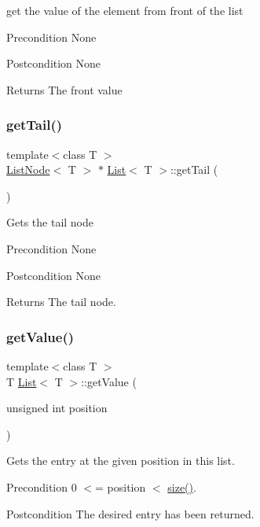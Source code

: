 get the value of the element from front of the list \begin{DoxyPrecond}{Precondition}
None 
\end{DoxyPrecond}
\begin{DoxyPostcond}{Postcondition}
None 
\end{DoxyPostcond}
\begin{DoxyReturn}{Returns}
The front value 
\end{DoxyReturn}
\mbox{\label{class_list_a9d222b730d906bcf6fb0834c9c729788}} 
\subsubsection{\texorpdfstring{get\+Tail()}{getTail()}}
{\footnotesize\ttfamily template$<$class T $>$ \\
\hyperlink{class_list_node}{List\+Node}$<$ T $>$ $\ast$ \hyperlink{class_list}{List}$<$ T $>$\+::get\+Tail (\begin{DoxyParamCaption}{ }\end{DoxyParamCaption})}

Gets the tail node \begin{DoxyPrecond}{Precondition}
None 
\end{DoxyPrecond}
\begin{DoxyPostcond}{Postcondition}
None 
\end{DoxyPostcond}
\begin{DoxyReturn}{Returns}
The tail node. 
\end{DoxyReturn}
\mbox{\label{class_list_a54d9d5eb688177d16ae8f33a317282a5}} 
\subsubsection{\texorpdfstring{get\+Value()}{getValue()}}
{\footnotesize\ttfamily template$<$class T $>$ \\
T \hyperlink{class_list}{List}$<$ T $>$\+::get\+Value (\begin{DoxyParamCaption}\item[{unsigned int}]{position }\end{DoxyParamCaption})}

Gets the entry at the given position in this list. \begin{DoxyPrecond}{Precondition}
0 $<$= position $<$ \hyperlink{class_list_aec8852ab225094e14ad424e8d71a4dac}{size()}. 
\end{DoxyPrecond}
\begin{DoxyPostcond}{Postcondition}
The desired entry has been returned. 
\end{DoxyPostcond}

